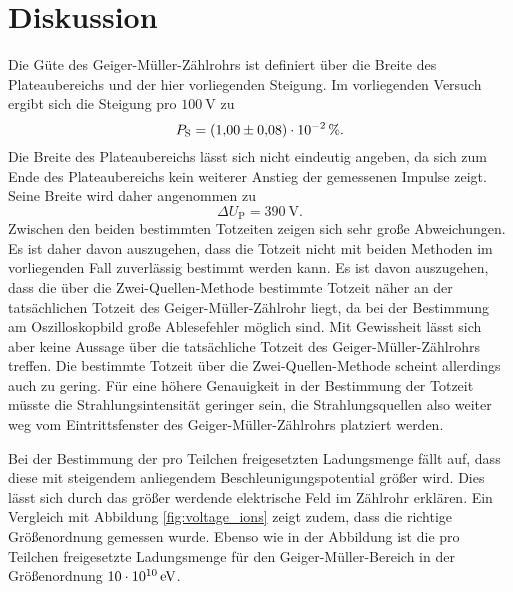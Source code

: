 \section{Diskussion}
\label{sec:Diskussion}
Die Güte des Geiger-Müller-Zählrohrs ist definiert über die Breite des Plateaubereichs und der hier vorliegenden Steigung.
Im vorliegenden Versuch ergibt sich die Steigung pro $\SI{100}{\volt}$ zu
\begin{equation*}
  P_{\mathrm{S}}=\SI{1.00(8)E-02}{\percent} \text{.}
\end{equation*}
Die Breite des Plateaubereichs lässt sich nicht eindeutig angeben, da sich zum Ende des Plateaubereichs kein weiterer Anstieg der gemessenen Impulse zeigt.
Seine Breite wird daher angenommen zu
\begin{equation*}
  \Delta U_\mathrm{P}=\SI{390}{\volt}\text{.}
\end{equation*}
Zwischen den beiden bestimmten Totzeiten zeigen sich sehr große Abweichungen.
Es ist daher davon auszugehen, dass die Totzeit nicht mit beiden Methoden im vorliegenden Fall zuverlässig bestimmt werden kann. Es ist davon auszugehen, dass die über die Zwei-Quellen-Methode bestimmte Totzeit näher an der tatsächlichen Totzeit des Geiger-Müller-Zählrohr liegt, da bei der Bestimmung am Oszilloskopbild große Ablesefehler möglich sind.
Mit Gewissheit lässt sich aber keine Aussage über die tatsächliche Totzeit des Geiger-Müller-Zählrohrs treffen.
Die bestimmte Totzeit über die Zwei-Quellen-Methode scheint allerdings auch zu gering.
Für eine höhere Genauigkeit in der Bestimmung der Totzeit müsste die Strahlungsintensität geringer sein, die Strahlungsquellen also weiter weg vom Eintrittsfenster des Geiger-Müller-Zählrohrs platziert werden.


Bei der Bestimmung der pro Teilchen freigesetzten Ladungsmenge fällt auf, dass diese mit steigendem anliegendem Beschleunigungspotential größer wird.
Dies lässt sich durch das größer werdende elektrische Feld im Zählrohr erklären.
Ein Vergleich mit Abbildung \ref{fig:voltage_ions} zeigt zudem, dass die richtige Größenordnung gemessen wurde. Ebenso wie in der Abbildung ist die pro Teilchen freigesetzte Ladungsmenge für den Geiger-Müller-Bereich in der Größenordnung $\SI{10E10}{\electronvolt}$.
